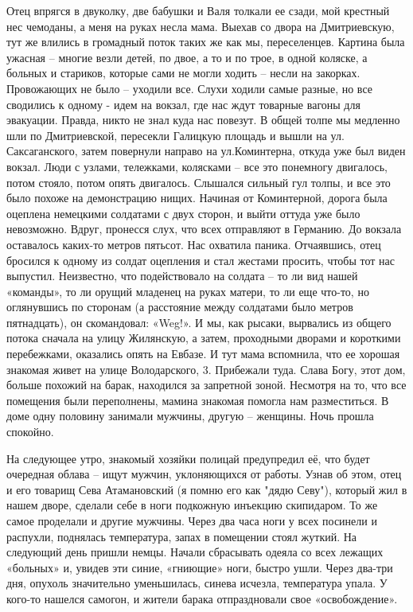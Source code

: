 Отец впрягся в двуколку, две бабушки и Валя толкали ее сзади, мой крестный нес
чемоданы, а меня на руках несла мама. Выехав со двора на Дмитриевскую, тут же
влились в громадный поток таких же как мы, переселенцев. Картина была ужасная –
многие везли детей, по двое, а то и по трое, в одной коляске, а больных и
стариков, которые сами не могли ходить – несли на закорках. Провожающих не было
– уходили все. Слухи ходили самые разные, но все сводились к одному - идем на
вокзал, где нас ждут товарные вагоны для эвакуации. Правда, никто не знал куда
нас повезут. В общей толпе мы медленно шли по Дмитриевской, пересекли Галицкую
площадь и вышли на ул. Саксаганского, затем повернули направо на ул.Коминтерна,
откуда уже был виден вокзал. Люди с узлами, тележками, колясками – все это
понемногу двигалось, потом стояло, потом опять двигалось. Слышался сильный гул
толпы, и все это было похоже на демонстрацию нищих. Начиная от Коминтерной,
дорога была оцеплена немецкими солдатами с двух сторон, и выйти оттуда уже было
невозможно. Вдруг, пронесся слух, что всех отправляют в Германию. До вокзала
оставалось каких-то метров пятьсот. Нас охватила паника. Отчаявшись, отец
бросился к одному из солдат оцепления и стал жестами просить, чтобы тот нас
выпустил. Неизвестно, что подействовало на солдата – то ли вид нашей «команды»,
то ли орущий младенец на руках матери, то ли еще что-то, но оглянувшись по
сторонам (а расстояние между солдатами было метров пятнадцать), он скомандовал:
«Weg!». И мы, как рысаки, вырвались из общего потока сначала на улицу
Жилянскую, а затем, проходными дворами и короткими перебежками, оказались опять
на Евбазе. И тут мама вспомнила, что ее хорошая знакомая живет на улице
Володарского, 3. Прибежали туда. Слава Богу, этот дом, больше похожий на барак,
находился за запретной зоной. Несмотря на то, что все помещения были
переполнены, мамина знакомая помогла нам разместиться. В доме одну половину
занимали мужчины, другую – женщины. Ночь прошла спокойно.

На следующее утро, знакомый хозяйки полицай предупредил её, что будет очередная
облава – ищут мужчин, уклоняющихся от работы. Узнав об этом, отец и его товарищ
Сева Атамановский (я помню его как "дядю Севу"), который жил в нашем дворе,
сделали себе в ноги подкожную инъекцию скипидаром. То же самое проделали и
другие мужчины. Через два часа ноги у всех посинели и распухли, поднялась
температура, запах в помещении стоял жуткий. На следующий день пришли немцы.
Начали сбрасывать одеяла со всех лежащих «больных» и, увидев эти синие,
«гниющие» ноги, быстро ушли. Через два-три дня, опухоль значительно
уменьшилась, синева исчезла, температура упала. У кого-то нашелся самогон, и
жители барака отпраздновали свое «освобождение».


